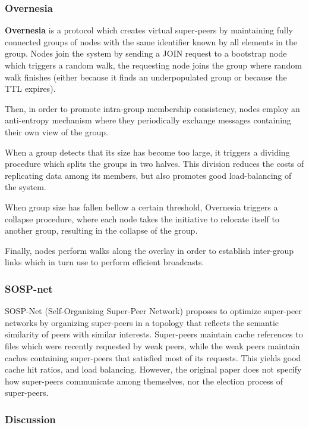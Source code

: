 \subsubsection{Overnesia}

\textbf{Overnesia} \cite{leitao2014overnesia} is a protocol which creates virtual super-peers by maintaining fully connected groups of nodes with the same identifier known by all elements in the group. Nodes join the system by sending a JOIN request to a bootstrap node which triggers a random walk, the requesting node joins the group where random walk finishes (either because it finds an underpopulated group or because the TTL expires). 

Then, in order to promote intra-group membership consistency, nodes employ an anti-entropy mechanism where they periodically exchange messages containing their own view of the group. 

When a group detects that its size has become too large, it triggers a dividing procedure which splits the groups in two halves. This division reduces the costs of replicating data among its members, but also promotes good load-balancing of the system. 

When group size has fallen bellow a certain threshold, Overnesia triggers a collapse procedure, where each node takes the initiative to relocate itself to another group, resulting in the collapse of the group. 

Finally, nodes perform walks along the overlay in order to establish inter-group links which in turn use to perform efficient broadcasts.

\subsubsection{SOSP-net}

SOSP-Net \cite{garbacki2007optimizing}  (Self-Organizing Super-Peer Network) proposes to optimize super-peer networks by organizing super-peers in a topology that reflects the semantic similarity of peers with similar interests. Super-peers maintain cache references to files which were recently requested by weak peers, while the weak peers maintain caches containing super-peers that satisfied most of its requests. This yields good cache hit ratios, and load balancing. However, the original paper does not specify how super-peers communicate among themselves, nor the election process of super-peers.

\subsubsection{Discussion}

